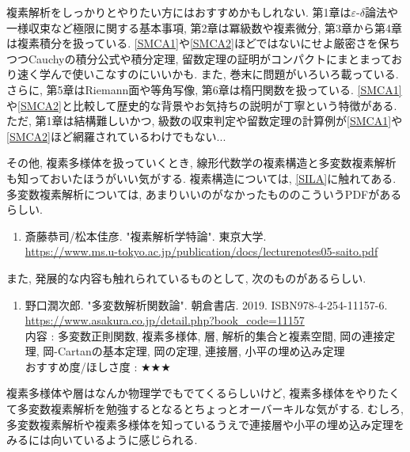 \documentclass[10pt,a4paper]{jsarticle}
\begin{document}
    複素解析をしっかりとやりたい方にはおすすめかもしれない. 第1章は$\varepsilon$-$\delta$論法や一様収束など極限に関する基本事項, 第2章は冪級数や複素微分, 第3章から第4章は複素積分を扱っている. \ref{SMCA1}や\ref{SMCA2}ほどではないにせよ厳密さを保ちつつCauchyの積分公式や積分定理, 留数定理の証明がコンパクトにまとまっており速く学んで使いこなすのにいいかも. また, 巻末に問題がいろいろ載っている. さらに, 第5章はRiemann面や等角写像, 第6章は楕円関数を扱っている. \ref{SMCA1}や\ref{SMCA2}と比較して歴史的な背景やお気持ちの説明が丁寧という特徴がある. ただ, 第1章は結構難しいかつ, 級数の収束判定や留数定理の計算例が\ref{SMCA1}や\ref{SMCA2}ほど網羅されているわけでもない... \par
    その他, 複素多様体を扱っていくとき, 線形代数学の複素構造と多変数複素解析も知っておいたほうがいい気がする. 複素構造については, \ref{SILA}に触れてある. 多変数複素解析については, あまりいいのがなかったもののこういうPDFがあるらしい. 
    \begin{enumerate}
        \renewcommand{\theenumi}{\arabic{enumi}}
        \renewcommand{\labelenumi}{[\theenumi]}
        \setcounter{enumi}{6}
        \item \label{SMCA} 斎藤恭司/松本佳彦. "複素解析学特論". 東京大学. \\
        \url{https://www.ms.u-tokyo.ac.jp/publication/docs/lecturenotes05-saito.pdf} 
    \end{enumerate}
    また, 発展的な内容も触れられているものとして, 次のものがあるらしい. 
    \begin{enumerate}
        \renewcommand{\theenumi}{[CA\arabic{enumi}]}
        \renewcommand{\labelenumi}{\theenumi}
        \setcounter{enumi}{5}
        \item \label{NJCA} 野口潤次郎. "多変数解析関数論". 朝倉書店. 2019. ISBN978-4-254-11157-6. \\
        \url{https://www.asakura.co.jp/detail.php?book_code=11157} \\
        内容 : 多変数正則関数, 複素多様体, 層, 解析的集合と複素空間, 岡の連接定理, 岡-Cartanの基本定理, 岡の定理, 連接層, 小平の埋め込み定理\\
        おすすめ度/ほしさ度 : $\bigstar \bigstar \bigstar $
    \end{enumerate}
    複素多様体や層はなんか物理学でもでてくるらしいけど, 複素多様体をやりたくて多変数複素解析を勉強するとなるとちょっとオーバーキルな気がする. むしろ, 多変数複素解析や複素多様体を知っているうえで連接層や小平の埋め込み定理をみるには向いているように感じられる. 
\end{document}
